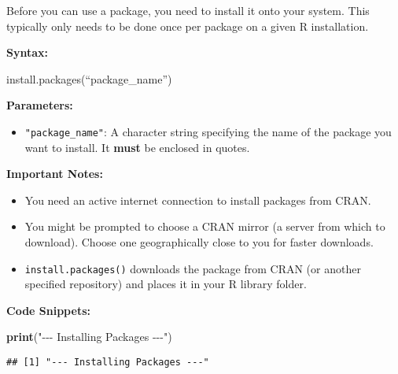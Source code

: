\documentclass[
]{article}
\newenvironment{Shaded}{\begin{snugshade}}{\end{snugshade}}
\newcommand{\FunctionTok}[1]{\textcolor[rgb]{0.13,0.29,0.53}{\textbf{#1}}}
\newcommand{\NormalTok}[1]{#1}
\newcommand{\StringTok}[1]{\textcolor[rgb]{0.31,0.60,0.02}{#1}}
\providecommand{\tightlist}{%
  \setlength{\itemsep}{0pt}\setlength{\parskip}{0pt}}
\begin{document}
Before you can use a package, you need to install it onto your system.
This typically only needs to be done once per package on a given R
installation.

\textbf{Syntax:}

install.packages(``package\_name'')

\textbf{Parameters:}

\begin{itemize}
\tightlist
\item
  \texttt{"package\_name"}: A character string specifying the name of
  the package you want to install. It \textbf{must} be enclosed in
  quotes.
\end{itemize}

\textbf{Important Notes:}

\begin{itemize}
\tightlist
\item
  You need an active internet connection to install packages from CRAN.
\item
  You might be prompted to choose a CRAN mirror (a server from which to
  download). Choose one geographically close to you for faster
  downloads.
\item
  \texttt{install.packages()} downloads the package from CRAN (or
  another specified repository) and places it in your R library folder.
\end{itemize}

\textbf{Code Snippets:}

\begin{Shaded}
\begin{Highlighting}[]
\FunctionTok{print}\NormalTok{(}\StringTok{"{-}{-}{-} Installing Packages {-}{-}{-}"}\NormalTok{)}
\end{Highlighting}
\end{Shaded}

\begin{verbatim}
## [1] "--- Installing Packages ---"
\end{verbatim}
\end{document}
